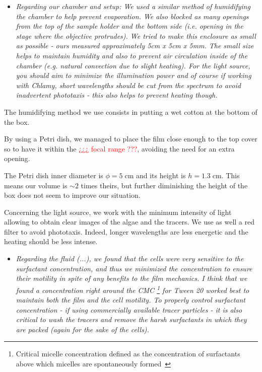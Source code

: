 \begin{itemize}
	\item \textit{Regarding our chamber and setup: We used a similar method of humidifying the chamber to help prevent evaporation. We also blocked as many openings from the top of the sample holder and the bottom side (i.e. opening in the stage where the objective protrudes). We tried to make this enclosure as small as possible - ours measured approximately 5cm x 5cm x 5mm. The small size helps to maintain humidity and also to prevent air circulation inside of the chamber (e.g. natural convection due to slight heating). For the light source, you should aim to minimize the illumination power and of course if working with Chlamy, short wavelengths should be cut from the spectrum to avoid inadvertent phototaxis - this also helps to prevent heating though.}
\end{itemize}

The humidifying method we use consists in putting a wet cotton at the bottom of the box. 

By using a Petri dish, we managed to place the film close enough to the top cover so to have it within the \textcolor{red}{¿¿¿ focal range ???}, avoiding the need for an extra opening. 

The Petri dish inner diameter is $\phi = 5 \; \textrm{cm}$ and its height is $h = 1.3 \; \textrm{cm}$. This means our volume is $\sim 2$ times theirs, but further diminishing the height of the box does not seem to improve our situation.

Concerning the light source, we work with the minimum intensity of light allowing to obtain clear images of the algae and the tracers. We use as well a red filter to avoid phototaxis. Indeed, longer wavelengths are less energetic and the heating should be less intense. 

\begin{itemize}
	\item \textit{Regarding the fluid (...), we found that the cells were very sensitive to the surfactant concentration, and thus we minimized the concentration to ensure their motility in spite of any benefits to the film mechanics. I think that we found a concentration right around the CMC \footnote{Critical micelle concentration defined as the concentration of surfactants above which micelles are spontaneously formed~\cite{Sheng2011}} for Tween 20 worked best to maintain both the film and the cell motility. To properly control surfactant concentration - if using commercially available tracer particles - it is also critical to wash the tracers and remove the harsh surfactants in which they are packed (again for the sake of the cells).}
\end{itemize}

